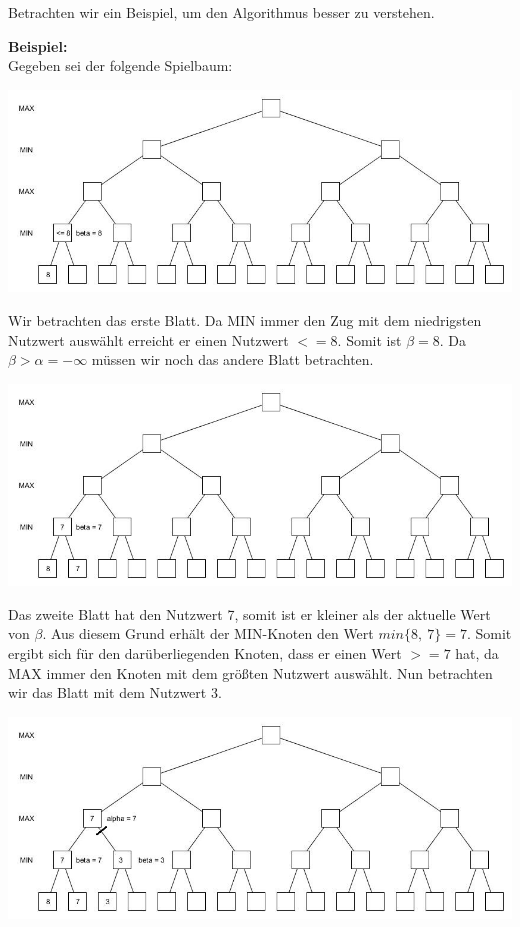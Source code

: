 Betrachten wir ein Beispiel, um den Algorithmus besser zu verstehen.
\newline

\textbf{Beispiel:}\\

Gegeben sei der folgende Spielbaum:
\begin{center}
	\includegraphics[width = 12 cm]{chapters/minimax/jpg/Alpha-beta1.jpg}
\end{center}

Wir betrachten das erste Blatt. Da MIN immer den Zug mit dem niedrigsten Nutzwert auswählt erreicht er einen Nutzwert $<=8$. Somit ist $\beta = 8$. Da $\beta > \alpha = -\infty$ müssen wir noch das andere Blatt betrachten.

\begin{center}
	\includegraphics[width = 12 cm]{chapters/minimax/jpg/Alpha-beta2.jpg}
\end{center}

Das zweite Blatt hat den Nutzwert 7, somit ist er kleiner als der aktuelle Wert von $\beta$. Aus diesem Grund erhält der MIN-Knoten den Wert $min\{8,~7\} =7$. Somit ergibt sich für den darüberliegenden Knoten, dass er einen Wert $>=7$ hat, da MAX immer den Knoten mit dem größten Nutzwert auswählt. Nun betrachten wir das Blatt mit dem Nutzwert 3.

\begin{center}
	\includegraphics[width = 12 cm]{chapters/minimax/jpg/Alpha-beta3.jpg}
\end{center}

